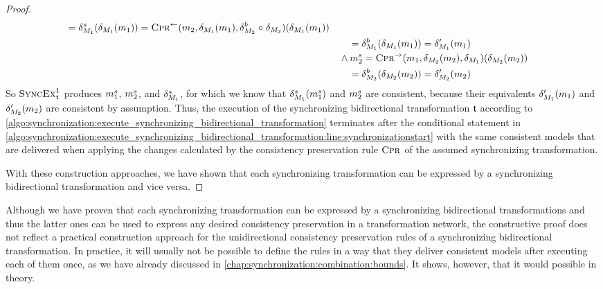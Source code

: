 \begin{proof}
\begin{align*}
        = \change{\metamodel{M}{1}}^{s}(\change{\metamodel{M}{1}}(\model{m}{1})) %
        = \consistencypreservationrule{}^{\leftarrow}(\model{m}{2},\change{\metamodel{M}{1}}(\model{m}{1}),\change{\metamodel{M}{2}}^{b} \concatfunction \change{\metamodel{M}{2}})(\change{\metamodel{M}{1}}(\model{m}{1})) %
        \\
        & \formulaskip\formulaskip
        = \change{\metamodel{M}{1}}^{b}(\change{\metamodel{M}{1}}(\model{m}{1}))
        = \change{\metamodel{M}{1}}'(\model{m}{1}) \\
        & \formulaskip
        \land
        \model{m}{2}^{s}
        = \consistencypreservationrule{}^{\rightarrow}(\model{m}{1},\change{\metamodel{M}{2}}(\model{m}{2}),\change{\metamodel{M}{1}})(\change{\metamodel{M}{2}}(\model{m}{2})) %
        \\
        & \formulaskip\formulaskip
        = \change{\metamodel{M}{2}}^{b}(\change{\metamodel{M}{2}}(\model{m}{2})) %
        = \change{\metamodel{M}{2}}'(\model{m}{2})
    \end{align*}
    So $\function{SyncEx}_{\transformation{t}}^1$ produces $\model{m}{1}^{s}$, $\model{m}{2}^{s}$, and $\change{\metamodel{M}{1}}^{s}$, for which we know that $\change{\metamodel{M}{1}}^{s}(\model{m}{1}^{s})$ and $\model{m}{2}^{s}$ are consistent, because their equivalents $\change{\metamodel{M}{1}}'(\model{m}{1})$ and $\change{\metamodel{M}{2}}'(\model{m}{2})$ are consistent by assumption.
    Thus, the execution of the synchronizing bidirectional transformation $\transformation{t}$ according to \autoref{algo:synchronization:execute_synchronizing_bidirectional_transformation} terminates after the conditional statement in \autoref{algo:synchronization:execute_synchronizing_bidirectional_transformation:line:synchronizationstart} with the same consistent models that are delivered when applying the changes calculated by the consistency preservation rule $\textsc{Cpr}_{}$ of the assumed synchronizing transformation.

    With these construction approaches, we have shown that each synchronizing transformation can be expressed by a synchronizing bidirectional transformation and vice versa.
\end{proof}

Although we have proven that each synchronizing transformation can be expressed by a synchronizing bidirectional transformations and thus the latter ones can be used to express any desired consistency preservation in a transformation network, the constructive proof does not reflect a practical construction approach for the unidirectional consistency preservation rules of a synchronizing bidirectional transformation.
In practice, it will usually not be possible to define the rules in a way that they deliver consistent models after executing each of them once, as we have already discussed in \autoref{chap:synchronization:combination:bounds}.
It shows, however, that it would possible in theory.

